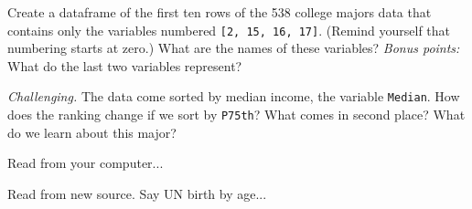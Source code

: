 \documentclass[11pt]{exam}
\begin{document}
\begin{questions}
\item Create a dataframe of the first ten rows of the 538 college majors data
that contains only the variables numbered \texttt{[2, 15, 16, 17]}.
(Remind yourself that numbering starts at zero.)
What are the names of these variables?
{\it Bonus points:\/} What do the last two variables represent?

\item {\it Challenging.\/}
The data come sorted by median income, the variable \texttt{Median}.
How does the ranking change if we sort by \texttt{P75th}?
What comes in second place?  What do we learn about this major?

\item Read from your computer...


\item Read from new source.  Say UN birth by age...  


\end{questions}
\end{document}
